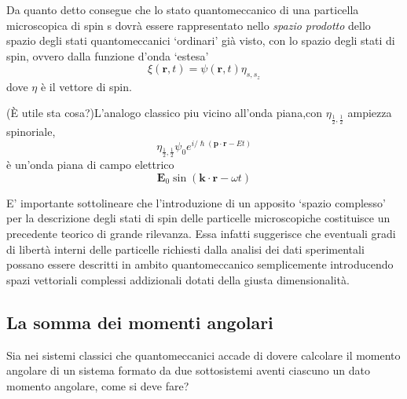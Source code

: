 Da quanto detto consegue che lo stato quantomeccanico di una particella
microscopica di spin s dovrà essere rappresentato nello \emph{spazio
	prodotto} dello spazio degli stati quantomeccanici `ordinari' già visto,
con lo spazio degli stati di spin, ovvero dalla funzione d'onda `estesa'
\[
	\xi(\bm{r},t) =   \psi(\bm{r},t) \eta_{s,s_{z}}
\] dove \(\eta\) è il vettore di spin.

(È utile sta cosa?)L'analogo classico piu vicino all'onda piana,con
\(\eta_{\frac{1}{2}, \frac{1}{2}}\) ampiezza spinoriale, \[
	\eta_{\frac{1}{2}, \frac{1}{2}} \psi_{0}e^{ i/\hslash (\bm{p}\cdot \bm{r} - Et)}
\] è un'onda piana di campo elettrico \[
	\bm{E}_{0} \sin(\bm{k}\cdot \bm{r} - \omega t)
\]

E' importante sottolineare che l'introduzione di un apposito `spazio
complesso' per la descrizione degli stati di spin delle particelle
microscopiche costituisce un precedente teorico di grande rilevanza.
Essa infatti suggerisce che eventuali gradi di libertà interni delle
particelle richiesti dalla analisi dei dati sperimentali possano essere
descritti in ambito quantomeccanico semplicemente introducendo spazi
vettoriali complessi addizionali dotati della giusta dimensionalità.

\subsection{La somma dei momenti angolari}\label{sec:somma-dei-momenti-angolari}

Sia nei sistemi classici che quantomeccanici accade di dovere calcolare
il momento angolare di un sistema formato da due sottosistemi aventi
ciascuno un dato momento angolare, come si deve fare?

